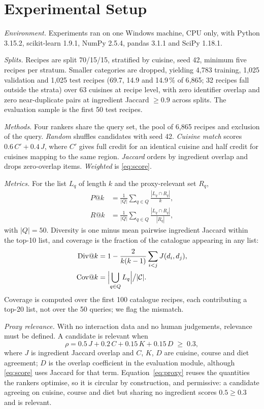 \documentclass[conference]{IEEEtran}
\begin{document}
\section{Experimental Setup} \label{sec:setup}

\emph{Environment.} Experiments ran on one Windows machine, CPU only, with Python 3.15.2, scikit-learn 1.9.1, NumPy 2.5.4, pandas 3.1.1 and SciPy 1.18.1.

\emph{Splits.} Recipes are split 70/15/15, stratified by cuisine, seed 42, minimum five recipes per stratum. Smaller categories are dropped, yielding 4{,}783 training, 1{,}025 validation and 1{,}025 test recipes (69.7, 14.9 and 14.9\,\% of 6{,}865; 32 recipes fall outside the strata) over 63 cuisines at recipe level, with zero identifier overlap and zero near-duplicate pairs at ingredient Jaccard $\geq 0.9$ across splits. The evaluation sample is the first 50 test recipes.

\emph{Methods.} Four rankers share the query set, the pool of 6{,}865 recipes and exclusion of the query. \emph{Random} shuffles candidates with seed 42. \emph{Cuisine match} scores $0.6\,C' + 0.4\,J$, where $C'$ gives full credit for an identical cuisine and half credit for cuisines mapping to the same region. \emph{Jaccard} orders by ingredient overlap and drops zero-overlap items. \emph{Weighted} is \eqref{eq:score}.

\emph{Metrics.} For the list $L_q$ of length $k$ and the proxy-relevant set $R_q$, \begin{align} P@k &= \frac{1}{|Q|}\sum_{q\in Q}\frac{|L_q \cap R_q|}{k}, \label{eq:p}\\ R@k &= \frac{1}{|Q|}\sum_{q\in Q}\frac{|L_q \cap R_q|}{|R_q|}, \label{eq:r} \end{align} with $|Q|=50$. Diversity is one minus mean pairwise ingredient Jaccard within the top-10 list, and coverage is the fraction of the catalogue appearing in any list: \begin{align} \mathrm{Div}@k &= 1 - \frac{2}{k(k-1)}\sum_{i<j} J(d_i,d_j), \label{eq:div}\\ \mathrm{Cov}@k &= \Bigl|\bigcup_{q\in Q} L_q\Bigr| \big/ |\mathcal{C}|. \label{eq:cov} \end{align} Coverage is computed over the first 100 catalogue recipes, each contributing a top-20 list, not over the 50 queries; we flag the mismatch.

\emph{Proxy relevance.} With no interaction data and no human judgements, relevance must be defined. A candidate is relevant when
\begin{equation}
\label{eq:proxy}
\rho = 0.5\,J + 0.2\,C + 0.15\,K + 0.15\,D \;\geq\; 0.3,
\end{equation}
where $J$ is ingredient Jaccard overlap and $C$, $K$, $D$ are cuisine, course and diet agreement; $D$ is the overlap coefficient in the evaluation module, although \eqref{eq:score} uses Jaccard for that term. Equation~\eqref{eq:proxy} reuses the quantities the rankers optimise, so it is circular by construction, and permissive: a candidate agreeing on cuisine, course and diet but sharing no ingredient scores $0.5 \geq 0.3$ and is relevant.
\end{document}
